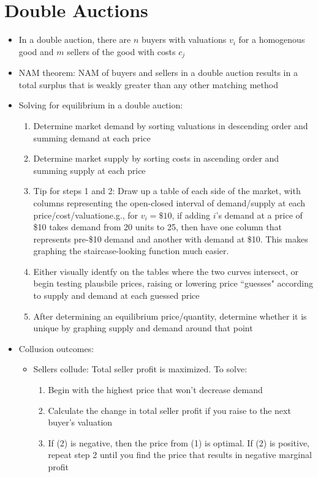 \documentclass{article}
\begin{document}

\section*{Double Auctions}

\begin{itemize}
	\item In a double auction, there are $n$ buyers with valuations $v_i$ for a homogenous good and $m$ sellers of the good with costs $c_j$
	
	\item NAM theorem: NAM of buyers and sellers in a double auction results in a total surplus that is weakly greater than any other matching method
	
	\item Solving for equilibrium in a double auction:
		\begin{enumerate}
			\item Determine market demand by sorting valuations in descending order and summing demand at each price
			\item Determine market supply by sorting costs in ascending order and summing supply at each price 
			\item Tip for steps 1 and 2: Draw up a table of each side of the market, with columns representing the open-closed interval of demand/supply at each price/cost/valuation\textemdash e.g., for ${v_i=\$10}$, if adding $i$'s demand at a price of \$10 takes demand from 20 units to 25, then have one column that represents pre-\$10 demand and another with demand at \$10. This makes graphing the staircase-looking function much easier.
			\item Either visually identfy on the tables where the two curves intersect, or begin testing plausbile prices, raising or lowering price ``guesses" according to supply and demand at each guessed price 
			\item After determining an equilibrium price/quantity, determine whether it is unique by graphing supply and demand around that point
		\end{enumerate}
	
	\item Collusion outcomes:
		\begin{itemize}
			\item Sellers collude: Total seller profit is maximized. To solve:
				\begin{enumerate}
					\item Begin with the highest price that won't decrease demand 
					\item Calculate the change in total seller profit if you raise to the next buyer's valuation
					\item If (2) is negative, then the price from (1) is optimal. If (2) is positive, repeat step 2 until you find the price that results in negative marginal profit
				\end{enumerate}
			

\end{itemize}
\end{itemize}
\end{document}
